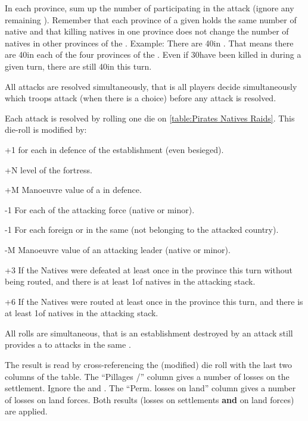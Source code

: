 \bparag In each province, sum up the number of \LD participating in the
attack (ignore any remaining \LDE).
\bparag Remember that each province of a given \Area holds the same number of
native \LD and that killing natives in one province does not change the number
of natives in other provinces of the \Area.
\bparag Example: There are 40\LD in \granderegionJapon. That means there are
40\LD in each of the four provinces of the \Area. Even if 30\LD have been
killed in \provinceEdo during a given turn, there are still 40\LD in
\provinceKyoto this turn.

\aparag All attacks are resolved simultaneously, that is all players decide
simultaneously which troops attack (when there is a choice) before any attack
is resolved.

\bparag Each attack is resolved by rolling one
die on \ref{table:Pirates
  Natives Raids}. This die-roll is modified by:
\begin{modlist}
\item[+1] for each \LD in defence of the establishment (even besieged).
\item[+N] level of the fortress.
\item[+M] Manoeuvre value of a  in defence.
\item[-1] For each \LD of the attacking force (native or \ROTW minor).
\item[-1] For each foreign \COL or \TP in the same \Area (not belonging to the
  attacked country).
\item[-M] Manoeuvre value of an attacking leader (native or \ROTW minor).
\item[+3] If the Natives were defeated at least once in the province this turn
  without being routed, and there is at least 1\LD of natives in the attacking
  stack.
\item[+6]If the Natives were routed at least once in the province this turn,
  and there is at least 1\LD of natives in the attacking stack.
\end{modlist}
\bparag All rolls are simultaneous, that is an establishment destroyed by an
attack still provides a  to attacks in the same \Area.

\bparag The result is read by cross-referencing the (modified) die roll with
the last two columns of the table.
\bparag The ``Pillages \TP/\COL'' column gives a number of losses on the
settlement. Ignore the \textddag\xspace and \textdag.
\bparag The ``Perm. losses on land'' column gives a number of losses on land
forces.
\bparag Both results (losses on settlements \textbf{and} on land forces) are
applied.

